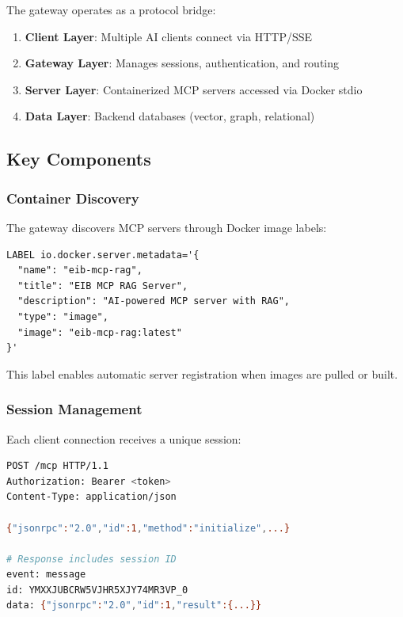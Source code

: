 \documentclass[11pt,letterpaper]{article}
\begin{document}
The gateway operates as a protocol bridge:

\begin{enumerate}[noitemsep]
    \item \textbf{Client Layer}: Multiple AI clients connect via HTTP/SSE
    \item \textbf{Gateway Layer}: Manages sessions, authentication, and routing
    \item \textbf{Server Layer}: Containerized MCP servers accessed via Docker stdio
    \item \textbf{Data Layer}: Backend databases (vector, graph, relational)
\end{enumerate}

\subsection{Key Components}

\subsubsection{Container Discovery}

The gateway discovers MCP servers through Docker image labels:

\begin{lstlisting}[caption={MCP Server Discovery Label}]
LABEL io.docker.server.metadata='{
  "name": "eib-mcp-rag",
  "title": "EIB MCP RAG Server",
  "description": "AI-powered MCP server with RAG",
  "type": "image",
  "image": "eib-mcp-rag:latest"
}'
\end{lstlisting}

This label enables automatic server registration when images are pulled or built.

\subsubsection{Session Management}

Each client connection receives a unique session:

\begin{lstlisting}[language=bash,caption={Session Initialization}]
POST /mcp HTTP/1.1
Authorization: Bearer <token>
Content-Type: application/json

{"jsonrpc":"2.0","id":1,"method":"initialize",...}

# Response includes session ID
event: message
id: YMXXJUBCRW5VJHR5XJY74MR3VP_0
data: {"jsonrpc":"2.0","id":1,"result":{...}}
\end{lstlisting}
\end{document}
